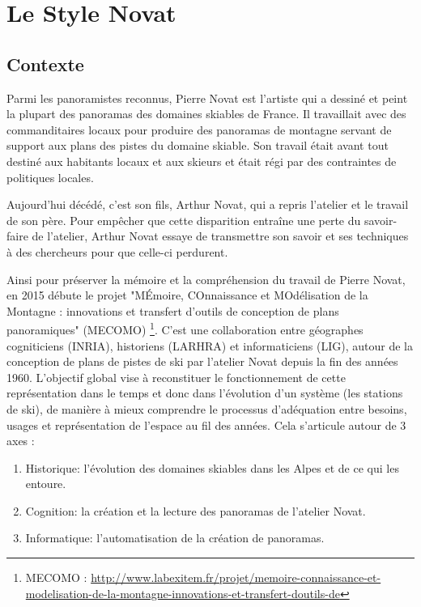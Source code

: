 \chapter{\label{chap:Novat} Le Style Novat}


\section{Contexte}


Parmi les panoramistes reconnus, Pierre Novat est l'artiste qui a dessiné et peint la plupart des panoramas des domaines skiables de France. Il travaillait avec des commanditaires locaux pour produire des panoramas de montagne servant de support aux plans des pistes du domaine skiable. Son travail était avant tout destiné aux habitants locaux et aux skieurs et était régi par des contraintes de politiques locales.

Aujourd'hui décédé, c'est son fils, Arthur Novat, qui a repris l'atelier et le travail de son père.  Pour empêcher que cette disparition entraîne une perte du savoir-faire de l'atelier, Arthur Novat essaye de transmettre son savoir et ses techniques à des chercheurs pour que celle-ci perdurent. 

Ainsi pour préserver la mémoire et la compréhension du travail de Pierre Novat, en 2015 débute le projet "MÉmoire, COnnaissance et MOdélisation de la Montagne : innovations et transfert d'outils de conception de plans panoramiques" (MECOMO) \footnote{MECOMO : \url{http://www.labexitem.fr/projet/memoire-connaissance-et-modelisation-de-la-montagne-innovations-et-transfert-doutils-de}}. C'est une collaboration entre géographes cogniticiens (INRIA), historiens (LARHRA) et informaticiens (LIG), autour de la conception de plans de pistes de ski par l'atelier Novat depuis la fin des années 1960. L’objectif global vise à reconstituer le fonctionnement de cette représentation dans le temps et donc dans l’évolution d’un système (les stations de ski), de manière à mieux comprendre le processus d’adéquation entre besoins, usages et représentation de l’espace au fil des années.
Cela s'articule autour de 3 axes : 
\begin{enumerate}
\item Historique: l’évolution des domaines skiables dans les Alpes et de ce qui les entoure. 
\item Cognition: la création et la lecture des panoramas de l'atelier Novat.
\item Informatique: l'automatisation de la création de panoramas.
\end{enumerate}

